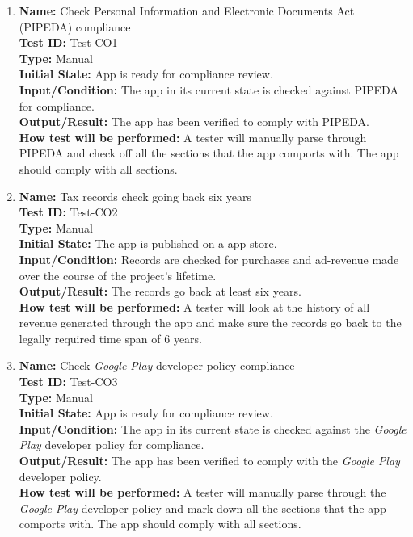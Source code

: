 \documentclass[12pt, titlepage]{article}
\begin{document}
\begin{enumerate}

    \item
    \textbf{Name:} Check Personal Information and Electronic
Documents Act (PIPEDA) \cite{PIPEDA} compliance \label{itm:Test-CO1} \\
    \textbf{Test ID:} Test-CO1 \\
    \textbf{Type:} Manual \\
    \textbf{Initial State:} App is ready for compliance review. \\
    \textbf{Input/Condition:} The app in its current state is checked against PIPEDA for compliance. \\
    \textbf{Output/Result:} The app has been verified to comply with PIPEDA. \\
    \textbf{How test will be performed:} A tester will manually parse through PIPEDA and check off all the sections that the app comports with. The app should comply with all sections.

    \item
    \textbf{Name:} Tax records check going back six years \label{itm:Test-CO2} \\
    \textbf{Test ID:} Test-CO2 \\
    \textbf{Type:} Manual \\
    \textbf{Initial State:} The app is published on a app store. \\
    \textbf{Input/Condition:} Records are checked for purchases and ad-revenue made over the course of the project's lifetime. \\
    \textbf{Output/Result:} The records go back at least six years. \\
    \textbf{How test will be performed:} A tester will look at the history of all revenue generated through the app and make sure the records go back to the legally required time span of 6 years.

    \item
    \textbf{Name:} Check \textit{Google Play} developer policy \cite{GooglePlay} compliance \label{itm:Test-CO3} \\
    \textbf{Test ID:} Test-CO3 \\
    \textbf{Type:} Manual \\
    \textbf{Initial State:} App is ready for compliance review. \\
    \textbf{Input/Condition:} The app in its current state is checked against the \textit{Google Play} developer policy for compliance. \\
    \textbf{Output/Result:} The app has been verified to comply with the \textit{Google Play} developer policy. \\
    \textbf{How test will be performed:} A tester will manually parse through the \textit{Google Play} developer policy and mark down all the sections that the app comports with. The app should comply with all sections.


\end{enumerate}
\end{document}
